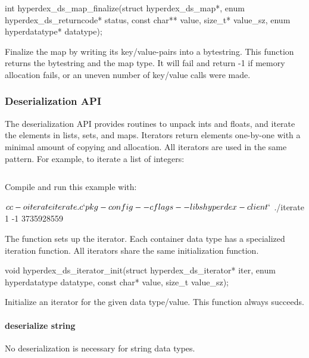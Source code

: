 \funcsep
\begin{ccode}
int hyperdex_ds_map_finalize(struct hyperdex_ds_map*,
                             enum hyperdex_ds_returncode* status,
                             const char** value, size_t* value_sz,
                             enum hyperdatatype* datatype);
\end{ccode}
\funcdesc Finalize the map by writing its key/value-pairs  into a bytestring.
This function returns the bytestring and the map type.  It will fail and return
-1 if memory allocation fails, or an uneven number of key/value calls were made.

\subsubsection{Deserialization API}

The deserialization API provides routines to unpack ints and floats, and iterate
the elements in lists, sets, and maps.  Iterators return elements one-by-one
with a minimal amount of copying and allocation.  All iterators are used in the
same pattern.  For example, to iterate a list of integers:

\inputminted{c}{api/c/iterate.c}

Compile and run this example with:

\begin{consolecode}
$ cc -o iterate iterate.c `pkg-config --cflags --libs hyperdex-client`
$ ./iterate
1
-1
3735928559
\end{consolecode}

The function  sets up the iterator.  Each
container data type has a specialized iteration function.  All iterators share
the same initialization function.

\begin{ccode}
void hyperdex_ds_iterator_init(struct hyperdex_ds_iterator* iter,
                               enum hyperdatatype datatype,
                               const char* value,
                               size_t value_sz);
\end{ccode}
\funcdesc Initialize an iterator for the given data type/value.  This function
always succeeds.

\paragraph{deserialize string}

No deserialization is necessary for string data types.

